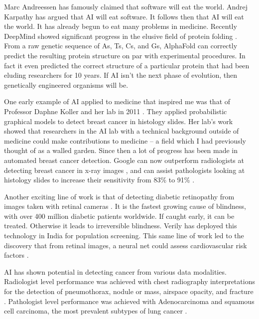 Marc Andreessen has famously claimed that software will eat the world.  Andrej Karpathy has argued that AI will eat software.  It follows then that AI will eat the world.  It has already begun to eat many problems in medicine.  Recently DeepMind showed significant progress in the elusive field of protein folding \cite{senior2020improved}.  From a raw genetic sequence of As, Ts, Cs, and Gs, AlphaFold can correctly predict the resulting protein structure on par with experimental procedures.  In fact it even predicted the correct structure of a particular protein that had been eluding researchers for 10 years.  If AI isn't the next phase of evolution, then genetically engineered organisms will be.  

One early example of AI applied to medicine that inspired me was that of Professor Daphne Koller and her lab in 2011 \cite{beck2011systematic}.  They applied probabilistic graphical models to detect breast cancer in histology slides.  Her lab's work showed that researchers in the AI lab with a technical background outside of medicine could make contributions to medicine -- a field which I had previously thought of as a walled garden.  Since then a lot of progress has been made in automated breast cancer detection.  Google can now outperform radiologists at detecting breast cancer in x-ray images \cite{mckinney2020international}, and can assist pathologists looking at histology slides to increase their sensitivity from 83\% to 91\% \cite{steiner2018impact}.  

Another exciting line of work is that of detecting diabetic retinopathy from images taken with retinal cameras \cite{gulshan2016development}.  It is the fastest growing cause of blindness, with over 400 million diabetic patients worldwide.  If caught early, it can be treated.  Otherwise it leads to irreversible blindness.  Verily has deployed this technology in India for population screening.  This same line of work led to the discovery that from retinal images, a neural net could assess cardiovascular risk factors \cite{poplin2018prediction}.

AI has shown potential in detecting cancer from various data modalities.   Radiologist level performance was achieved with chest radiography interpretations for the detection of pneumothorax, nodule or mass, airspace opacity, and fracture \cite{majkowska2020chest}.  Pathologist level performance was achieved with Adenocarcinoma and squamous cell carcinoma, the most prevalent subtypes of lung cancer \cite{coudray2018classification}.


